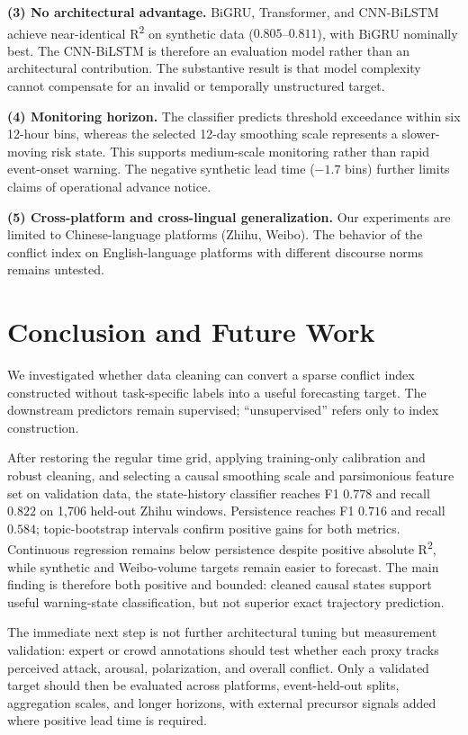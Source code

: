 \documentclass[journal]{IEEEtran}
\begin{document}
\textbf{(3) No architectural advantage.} BiGRU, Transformer, and CNN-BiLSTM achieve near-identical R\textsuperscript{2} on synthetic data ($0.805$--$0.811$), with BiGRU nominally best. The CNN-BiLSTM is therefore an evaluation model rather than an architectural contribution. The substantive result is that model complexity cannot compensate for an invalid or temporally unstructured target.

\textbf{(4) Monitoring horizon.} The classifier predicts threshold exceedance within six 12-hour bins, whereas the selected 12-day smoothing scale represents a slower-moving risk state. This supports medium-scale monitoring rather than rapid event-onset warning. The negative synthetic lead time ($-1.7$ bins) further limits claims of operational advance notice.

\textbf{(5) Cross-platform and cross-lingual generalization.} Our experiments are limited to Chinese-language platforms (Zhihu, Weibo). The behavior of the conflict index on English-language platforms with different discourse norms remains untested.

\section{Conclusion and Future Work}

We investigated whether data cleaning can convert a sparse conflict index constructed without task-specific labels into a useful forecasting target. The downstream predictors remain supervised; ``unsupervised'' refers only to index construction.

After restoring the regular time grid, applying training-only calibration and robust cleaning, and selecting a causal smoothing scale and parsimonious feature set on validation data, the state-history classifier reaches F1 $0.778$ and recall $0.822$ on 1,706 held-out Zhihu windows. Persistence reaches F1 $0.716$ and recall $0.584$; topic-bootstrap intervals confirm positive gains for both metrics. Continuous regression remains below persistence despite positive absolute R\textsuperscript{2}, while synthetic and Weibo-volume targets remain easier to forecast. The main finding is therefore both positive and bounded: cleaned causal states support useful warning-state classification, but not superior exact trajectory prediction.

The immediate next step is not further architectural tuning but measurement validation: expert or crowd annotations should test whether each proxy tracks perceived attack, arousal, polarization, and overall conflict. Only a validated target should then be evaluated across platforms, event-held-out splits, aggregation scales, and longer horizons, with external precursor signals added where positive lead time is required.
\end{document}
